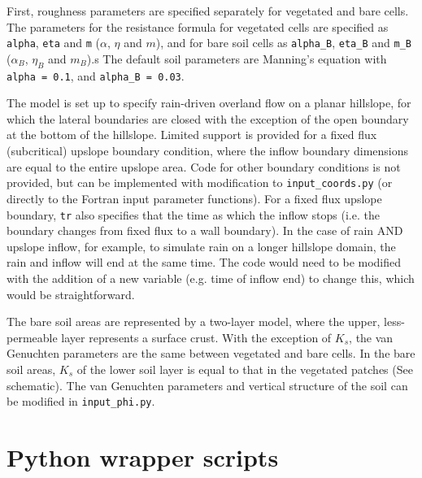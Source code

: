 \documentclass{article}
\newcommand{\code}[1]{\texttt{#1}}
\begin{document}
 
First,  roughness parameters are specified separately for vegetated and bare cells. 
 The parameters for the resistance formula for vegetated cells are specified as  \code{alpha}, \code{eta} and \code{m}  ($\alpha$, $\eta$ and $m$), and for bare soil cells as  \code{alpha\_B}, \code{eta\_B} and \code{m\_B}  ($\alpha_B$, $\eta_B$ and $m_B$).s
  The default soil parameters are Manning's equation with \code{alpha = 0.1}, and \code{alpha\_B = 0.03}.


The model is set up to specify rain-driven overland flow on a planar hillslope, for which the lateral boundaries are closed with the exception of the open boundary at the bottom of the hillslope.  Limited support is provided for a fixed flux (subcritical) upslope boundary condition,  where the inflow boundary dimensions are equal to the entire upslope area.  Code for other boundary conditions is not provided, but can be implemented with modification to \code{input\_coords.py} (or directly to the Fortran input parameter functions).
For a fixed flux upslope boundary, \code{tr} also specifies that the time as which the inflow stops (i.e. the boundary changes from fixed flux to a wall boundary).  In the case of rain AND upslope inflow, for example, to simulate rain on a longer hillslope domain, the rain and inflow will end at the same time. The code would need to be modified with the addition of a new variable (e.g. time of inflow end) to change this, which would be straightforward. 

The bare soil areas are represented by a two-layer model, where the upper, less-permeable  layer represents a surface crust.  With the exception of $K_{s}$, the van Genuchten parameters are the same between vegetated and bare cells. In the bare soil areas, $K_{s}$ of the lower soil layer is  equal to that in the vegetated patches (See schematic).
The van Genuchten parameters and vertical structure of the soil can be modified in \code{input\_phi.py}.


\section{Python wrapper scripts}



%
%
\end{document}
